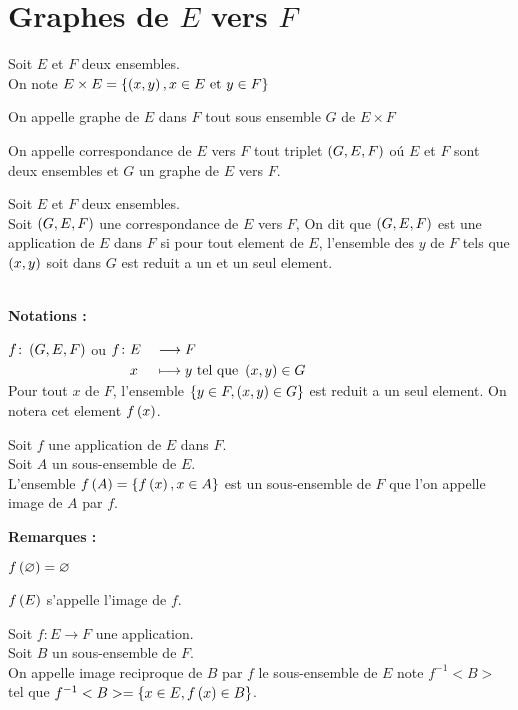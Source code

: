 \documentclass[12pt,twoside,a4paper]{article}
\author{MPSI 2}
\begin{document}
	\maketitle
	\section{Graphes de $E$ vers $F$}
		Soit $E$ et $F$ deux ensembles. \\
		On note $E\times E=\{\left(x,y\right),x\in E\text{ et } y\in F\}$
		\begin{defi}
			On appelle graphe de $E$ dans $F$ tout sous ensemble $G$ de $E\times F$
		\end{defi}
		\begin{defi}
			On appelle correspondance de $E$ vers $F$ tout triplet $\left(G,E,F\right)$ o\'u $E$ et $F$ sont deux ensembles et $G$ un graphe de $E$ vers $F$.
		\end{defi}
		\begin{defi}
			Soit $E$ et $F$ deux ensembles. \\
			Soit $\left(G,E,F\right)$ une correspondance de $E$ vers $F$, On dit que $\left(G,E,F\right)$ est une application de $E$ dans $F$ si pour tout element de $E$, l'ensemble des $y$ de $F$ tels que $\left(x,y\right)$ soit dans $G$ est reduit a un et un seul element.
		\end{defi}\ \\
		\textbf{Notations :}
		\begin{tab}
			$f\colon\left(G,E,F\right)$ ou $\begin{aligned}[t]f\colon&E&&\longrightarrow F \\&x&&\longmapsto y\text{ tel que }\left(x,y\right)\in G\end{aligned}$  \\
			Pour tout $x$ de $F$, l'ensemble $\{y\in F,\left(x,y\right)\in G\}$ est reduit a un seul element. On notera cet element $f\left(x\right)$.
		\end{tab}
		\begin{defi}
			Soit $f$ une application de $E$ dans $F$. \\
			Soit $A$ un sous-ensemble de $E$. \\
			L'ensemble $f\left(A\right)=\{f\left(x\right),x\in A\}$ est un sous-ensemble de $F$ que l'on appelle image de $A$ par $f$.
		\end{defi}\newpage
		\textbf{Remarques :}
		\begin{liste}
			\item $f\left(\varnothing\right)=\varnothing$
			\item $f\left(E\right)$ s'appelle l'image de $f$.
		\end{liste}
		\begin{defi}
			Soit $f\colon E\longrightarrow F$ une application. \\
			Soit $B$ un sous-ensemble de $F$. \\
			On appelle image reciproque de $B$ par $f$ le sous-ensemble de $E$ note $f^{-1}<B>$ tel que $f^{-1}<B>=\{x\in E,f\left(x\right)\in B\}$.
		\end{defi}\ \\
\end{document}
